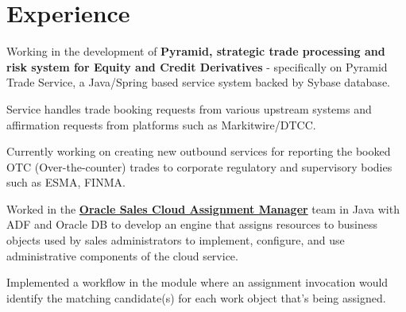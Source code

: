\documentclass[a4paper]{srika-resume} %
\begin{document}
\begin{minipage}[t]{0.64\textwidth} %


\section{Experience}


\vspace{\topsep} %
\begin{tightitemize}
\item Working in the development of \textbf{Pyramid, strategic trade processing and risk system for Equity and Credit Derivatives} - specifically on Pyramid Trade Service, a Java/Spring based service system backed by Sybase database.
\item Service handles trade booking requests from various upstream systems and affirmation requests from platforms such as Markitwire/DTCC. 
\item Currently working on creating new outbound services for reporting the booked OTC (Over-the-counter) trades to corporate regulatory and supervisory bodies such as ESMA, FINMA.
\end{tightitemize}

\sectionspace %



\begin{tightitemize}
\item Worked in the \textbf{\href{https://docs.oracle.com/cloud/latest/salescs_gs/OASAL/OASAL1439686.htm\#OASAL1439686}{Oracle Sales Cloud Assignment Manager}} team in Java with ADF and Oracle DB to develop an engine that assigns resources to business objects used by sales administrators to implement, configure, and use administrative components of the cloud service.
\item Implemented a workflow in the module where an assignment invocation would identify the matching candidate(s) for each work object that’s being assigned.
\end{tightitemize}


\end{minipage}
\end{document}

